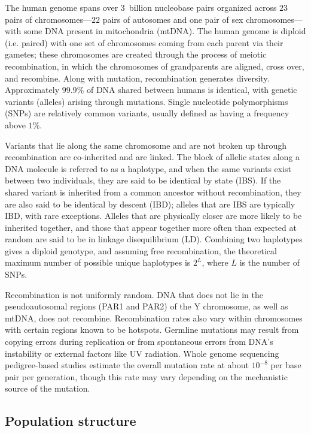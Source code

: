 The human genome spans over $3$~billion nucleobase pairs organized across $23$ pairs of chromosomes---$22$ pairs of autosomes and one pair of sex chromosomes---with some DNA present in mitochondria (mtDNA). The human genome is diploid (i.e. paired) with one set of chromosomes coming from each parent via their gametes; these chromosomes are created through the process of meiotic recombination, in which the chromosomes of grandparents are aligned, cross over, and recombine. Along with mutation, recombination generates diversity. Approximately $99.9\%$ of DNA shared between humans is identical, with genetic variants (alleles) arising through mutations. Single nucleotide polymorphisms (SNPs) are relatively common variants, usually defined as having a frequency above $1\%$.

Variants that lie along the same chromosome and are not broken up through recombination are co-inherited and are linked. The block of allelic states along a DNA molecule is referred to as a haplotype, and when the same variants exist between two individuals, they are said to be identical by state (IBS). If the shared variant is inherited from a common ancestor without recombination, they are also said to be identical by descent (IBD); alleles that are IBS are typically IBD, with rare exceptions. Alleles that are physically closer are more likely to be inherited together, and those that appear together more often than expected at random are said to be in linkage disequilibrium (LD). Combining two haplotypes gives a diploid genotype, and assuming free recombination, the theoretical maximum number of possible unique haplotypes is $2^L$, where $L$ is the number of SNPs.

Recombination is not uniformly random. DNA that does not lie in the pseudoautosomal regions (PAR1 and PAR2) of the Y chromosome, as well as mtDNA, does not recombine\citep{jobling_human_2013}. Recombination rates also vary within chromosomes with certain regions known to be hotspots\citep{altemose_map_2017}. Germline mutations may result from copying errors during replication or from spontaneous errors from DNA’s instability or external factors like UV radiation. Whole genome sequencing pedigree-based studies estimate the overall mutation rate at about $10^{-8}$ per base pair per generation, though this rate may vary depending on the mechanistic source of the mutation\citep{segurel_determinants_2014}.

\subsection{Population structure}

